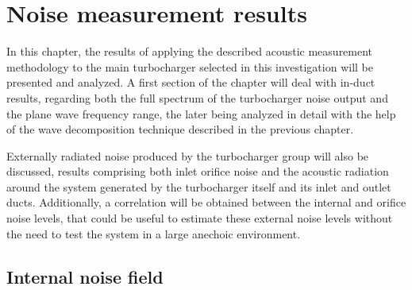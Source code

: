 \chapter{Noise measurement results} \label{cap:results}



\noindent In this chapter, the results of applying the described acoustic measurement methodology to the main turbocharger selected in this investigation will be presented and analyzed. A first section of the chapter will deal with in-duct results, regarding both the full spectrum of the turbocharger noise output and the plane wave frequency range, the later being  analyzed in detail with the help of the wave decomposition technique described in the previous chapter.

Externally radiated noise produced by the turbocharger group will also be discussed, results comprising both inlet orifice noise and the acoustic radiation around the system generated by the turbocharger itself and its inlet and outlet ducts. Additionally, a correlation will be obtained between the internal and orifice noise levels, that could be useful to estimate these external noise levels without the need to test the system in a large anechoic environment.

\section{Internal noise field}\label{sec:res_internal}

